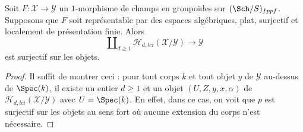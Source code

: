 \begin{lemma}
\label{lemma-lci-surjective}
Soit $F : \mathcal{X} \to \mathcal{Y}$ un $1$-morphisme de champs en groupoïdes
sur $(\Sch/S)_{fppf}$. Supposons que $F$ soit représentable par des espaces
algébriques, plat, surjectif et localement de présentation finie. Alors
$$
\coprod\nolimits_{d \geq 1} \mathcal{H}_{d, lci}(\mathcal{X}/\mathcal{Y})
\longrightarrow
\mathcal{Y}
$$
est surjectif sur les objets.
\end{lemma}

\begin{proof}
Il suffit de montrer ceci : pour tout corps $k$
et tout objet $y$ de $\mathcal{Y}$ au-dessus de $\Spec(k)$, il existe
un entier $d \geq 1$ et un objet $(U, Z, y, x, \alpha)$ de
$\mathcal{H}_{d, lci}(\mathcal{X}/\mathcal{Y})$ avec $U = \Spec(k)$.
En effet, dans ce cas, on voit que $p$ est surjectif sur les objets au
sens fort où aucune extension du corps n'est nécessaire.


\end{proof}
